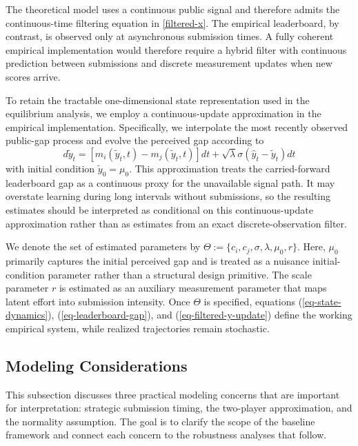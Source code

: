 \documentclass[mnsc]{informs3}
\begin{document}
The theoretical model uses a continuous public signal and therefore admits the continuous-time filtering equation in \eqref{filtered-x}. The empirical leaderboard, by contrast, is observed only at asynchronous submission times. A fully coherent empirical implementation would therefore require a hybrid filter with continuous prediction between submissions and discrete measurement updates when new scores arrive.

To retain the tractable one-dimensional state representation used in the equilibrium analysis, we employ a continuous-update approximation in the empirical implementation. Specifically, we interpolate the most recently observed public-gap process and evolve the perceived gap according to
\begin{equation}\label{eq-filtered-y-update}
d\tilde{y}_{t} = \left[m_i(\tilde{y}_t, t) - m_j(\tilde{y}_t, t)\right]dt + \sqrt{\lambda}\sigma(\hat{y}_t-\tilde{y}_{t}) dt
\end{equation}
with initial condition $\tilde{y}_0 = \mu_0$.
This approximation treats the carried-forward leaderboard gap as a continuous proxy for the unavailable signal path. It may overstate learning during long intervals without submissions, so the resulting estimates should be interpreted as conditional on this continuous-update approximation rather than as estimates from an exact discrete-observation filter.

We denote the set of estimated parameters by $\Theta := \{c_i, c_j, \sigma, \lambda, \mu_0,r\}$.
Here, $\mu_0$ primarily captures the initial perceived gap and is treated as a nuisance initial-condition parameter rather than a structural design primitive.
The scale parameter $r$ is estimated as an auxiliary measurement parameter that maps latent effort into submission intensity.
Once $\Theta$ is specified, equations (\ref{eq-state-dynamics}), (\ref{eq-leaderboard-gap}), and (\ref{eq-filtered-y-update}) define the working empirical system, while realized trajectories remain stochastic.



\subsection{Modeling Considerations}\label{sect-concerns}

This subsection discusses three practical modeling concerns that are important for interpretation: strategic submission timing, the two-player approximation, and the normality assumption.
The goal is to clarify the scope of the baseline framework and connect each concern to the robustness analyses that follow.
\end{document}
